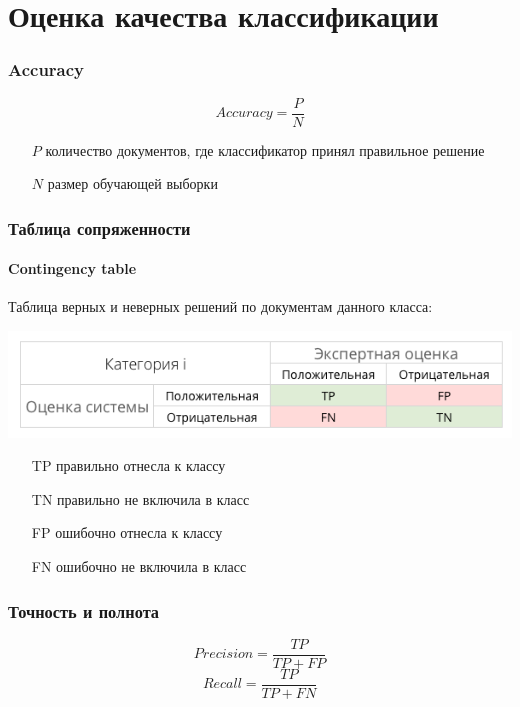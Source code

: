 \documentclass[svgnames]{beamer}
\begin{document}
\section{Оценка качества классификации}


\begin{frame}
  \frametitle{Accuracy}
  \begin{equation}
    \label{eq:a}
    Accuracy = \frac{P}{N}
  \end{equation}
  \begin{itemize}
  \item[$P$] количество документов, где классификатор принял
    правильное решение
  \item[$N$] размер обучающей выборки
  \end{itemize}
\end{frame}


\begin{frame}
  \frametitle{Таблица сопряженности}
  \framesubtitle{Contingency table}

  Таблица верных и неверных решений по документам данного класса:

  \includegraphics[width=\textwidth]{contingency-table}

  \begin{itemize}
  \item[TP] правильно отнесла к классу
  \item[TN] правильно не включила в класс
  \item[FP] ошибочно отнесла к классу
  \item[FN] ошибочно не включила в класс
  \end{itemize}
\end{frame}

\begin{frame}
  \frametitle{Точность и полнота}
  \begin{equation}
    \label{eq:p}
    Precision=\frac{TP}{TP + FP}
  \end{equation}
  \begin{equation}
    \label{eq:r}
    Recall=\frac{TP}{TP + FN}
  \end{equation}
\end{frame}
\end{document}
